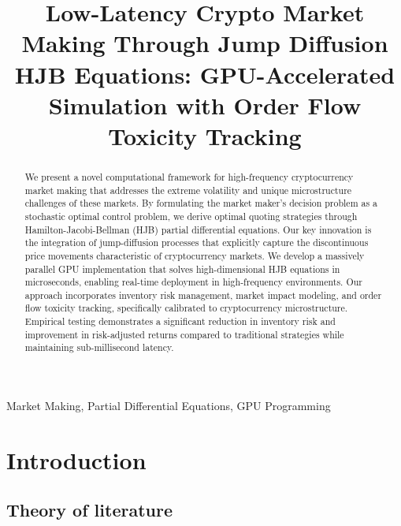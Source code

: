 \documentclass[twocolumn,11pt]{IEEEtran}  %
\begin{document}
\title{Low-Latency Crypto Market Making Through Jump Diffusion HJB Equations: GPU-Accelerated Simulation with Order Flow Toxicity Tracking}


\author{
}

\maketitle

\begin{abstract}
We present a novel computational framework for high-frequency cryptocurrency market making that addresses the extreme volatility and unique microstructure challenges of these markets. By formulating the market maker's decision problem as a stochastic optimal control problem, we derive optimal quoting strategies through Hamilton-Jacobi-Bellman (HJB) partial differential equations. Our key innovation is the integration of jump-diffusion processes that explicitly capture the discontinuous price movements characteristic of cryptocurrency markets. We develop a massively parallel GPU implementation that solves high-dimensional HJB equations in microseconds, enabling real-time deployment in high-frequency environments. Our approach incorporates inventory risk management, market impact modeling, and order flow toxicity tracking, specifically calibrated to cryptocurrency microstructure. Empirical testing demonstrates a significant reduction in inventory risk and improvement in risk-adjusted returns compared to traditional strategies while maintaining sub-millisecond latency.
\end{abstract}

\begin{IEEEkeywords}
Market Making, Partial Differential Equations, GPU Programming
\end{IEEEkeywords}

\section{Introduction}

\subsection{Theory of literature}
\end{document}
